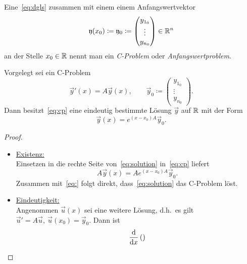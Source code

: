 Eine~\eqref{eq:dgls} zusammen mit einem einem Anfangswertvektor
\begin{equation*}
    \mathfrak{y}(x_0) \coloneqq \mathfrak{y}_0 \coloneqq \begin{pmatrix} y_{1_0}\\ \vdots\\ y_{n_0} \end{pmatrix} \in \mathbb{R}^n
\end{equation*}
an der Stelle $x_0 \in \mathbb{R}$ nennt man ein \emph{C-Problem} oder \emph{Anfangswertproblem}.

\begin{theorem}
    Vorgelegt sei ein C-Problem
    \begin{equation}\tag{CP}\label{eq:cp}
        \vec{y}'(x) = A \vec{y}(x), \qquad \vec{y}_0 \coloneqq \begin{pmatrix} y_{1_0}\\ \vdots\\ y_{n_0} \end{pmatrix}.
    \end{equation}
    Dann besitzt~\eqref{eq:cp} eine eindeutig bestimmte Lösung $\vec{y}$ auf $\mathbb{R}$ mit der Form
    \begin{equation}\tag{$\ast$}\label{eq:solution}
        \vec{y}(x) = e^{(x - x_0) A} \vec{y}_0.
    \end{equation}
\end{theorem}

\begin{proof}
    \begin{itemize}
        \item   \underline{Existenz:}\\
                Einsetzen in die rechte Seite von~\eqref{eq:solution} in~\eqref{eq:cp} liefert
                \begin{equation*}
                    A \vec{y}(x) = A e^{(x - x_0) A} \vec{y}_0.
                \end{equation*}
                Zusammen mit~\eqref{eq:} folgt direkt, dass~\eqref{eq:solution} das C-Problem löst.

        \item   \underline{Eindeutigkeit:}\\
                Angenommen $\vec{u}(x)$ sei eine weitere Lösung, d.h.~es gilt $\vec{u}' = A \vec{u},\ \vec{u}(x_0) = \vec{y}_0$.
                Dann ist
                \begin{align*}
                    \frac{\mathrm{d} }{\mathrm{d} x} \left(  \right)
                \end{align*}
    \end{itemize}
\end{proof}